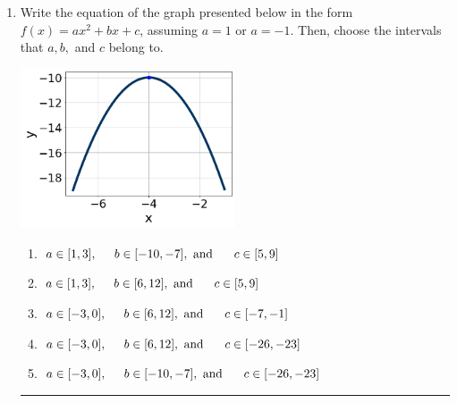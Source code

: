\documentclass[14pt]{extbook}
\newcommand{\litem}[1]{\item#1\hspace*{-1cm}\rule{\textwidth}{0.4pt}}
\begin{document}
\begin{enumerate}
{\begin{enumerate}[label=\Alph*.]
\end{enumerate} }
\litem{
Write the equation of the graph presented below in the form $f(x)=ax^2+bx+c$, assuming  $a=1$ or $a=-1$. Then, choose the intervals that $a, b,$ and $c$ belong to.
\begin{center}
    \includegraphics[width=0.5\textwidth]{../Figures/quadraticGraphToEquationCopyA.png}
\end{center}
\begin{enumerate}[label=\Alph*.]
\item \( a \in [1, 3], \hspace*{5mm} b \in [-10, -7], \text{ and } \hspace*{5mm} c \in [5, 9] \)
\item \( a \in [1, 3], \hspace*{5mm} b \in [6, 12], \text{ and } \hspace*{5mm} c \in [5, 9] \)
\item \( a \in [-3, 0], \hspace*{5mm} b \in [6, 12], \text{ and } \hspace*{5mm} c \in [-7, -1] \)
\item \( a \in [-3, 0], \hspace*{5mm} b \in [6, 12], \text{ and } \hspace*{5mm} c \in [-26, -23] \)
\item \( a \in [-3, 0], \hspace*{5mm} b \in [-10, -7], \text{ and } \hspace*{5mm} c \in [-26, -23] \)


\end{enumerate}}
\end{enumerate}
\end{document}
